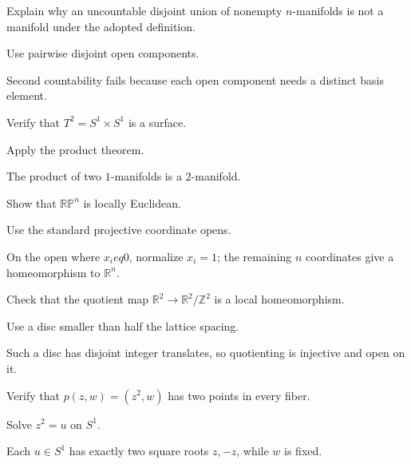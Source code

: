 \begin{exercise}\label{exr:vii01-14}
Explain why an uncountable disjoint union of nonempty \(n\)-manifolds is not a manifold under the adopted definition.
\end{exercise}
\begin{hint}
Use pairwise disjoint open components.
\end{hint}
\begin{solution}Second countability fails because each open component needs a distinct basis element.\end{solution}

\begin{exercise}\label{exr:vii01-15}
Verify that \(T^2=S^1\times S^1\) is a surface.
\end{exercise}
\begin{hint}
Apply the product theorem.
\end{hint}
\begin{solution}The product of two \(1\)-manifolds is a \(2\)-manifold.\end{solution}

\begin{exercise}\label{exr:vii01-16}
Show that \(\mathbb{RP}^n\) is locally Euclidean.
\end{exercise}
\begin{hint}
Use the standard projective coordinate opens.
\end{hint}
\begin{solution}On the open where \(x_i
eq0\), normalize \(x_i=1\); the remaining \(n\) coordinates give a homeomorphism to \(\mathbb R^n\).\end{solution}

\begin{exercise}\label{exr:vii01-17}
Check that the quotient map \(\mathbb R^2\to\mathbb R^2/\mathbb Z^2\) is a local homeomorphism.
\end{exercise}
\begin{hint}
Use a disc smaller than half the lattice spacing.
\end{hint}
\begin{solution}Such a disc has disjoint integer translates, so quotienting is injective and open on it.\end{solution}

\begin{exercise}\label{exr:vii01-18}
Verify that \(p(z,w)=(z^2,w)\) has two points in every fiber.
\end{exercise}
\begin{hint}
Solve \(z^2=u\) on \(S^1\).
\end{hint}
\begin{solution}Each \(u\in S^1\) has exactly two square roots \(z,-z\), while \(w\) is fixed.\end{solution}

